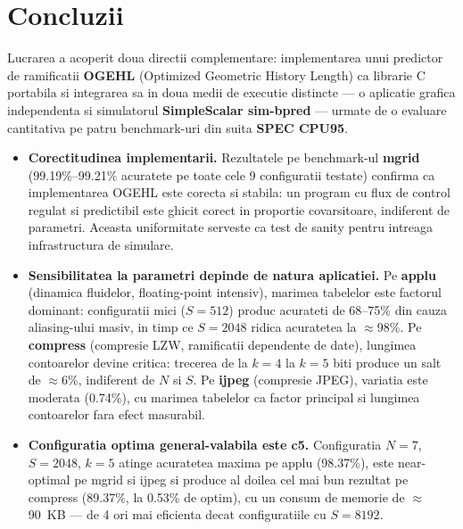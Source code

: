 \section{Concluzii}

Lucrarea a acoperit doua directii complementare: implementarea unui predictor de
ramificatii \textbf{OGEHL} (Optimized Geometric History Length) ca librarie C
portabila si integrarea sa in doua medii de executie distincte --- o aplicatie
grafica independenta si simulatorul \textbf{SimpleScalar sim-bpred} --- urmate de
o evaluare cantitativa pe patru benchmark-uri din suita \textbf{SPEC CPU95}.

\begin{itemize}
    \item \textbf{Corectitudinea implementarii.}
          Rezultatele pe benchmark-ul \textbf{mgrid} (99.19\%--99.21\% acuratete
          pe toate cele 9 configuratii testate) confirma ca implementarea OGEHL
          este corecta si stabila: un program cu flux de control regulat si
          predictibil este ghicit corect in proportie covarsitoare, indiferent
          de parametri. Aceasta uniformitate serveste ca test de sanity pentru
          intreaga infrastructura de simulare.

    \item \textbf{Sensibilitatea la parametri depinde de natura aplicatiei.}
          Pe \textbf{applu} (dinamica fluidelor, floating-point intensiv),
          marimea tabelelor este factorul dominant: configuratii mici
          ($S=512$) produc acurateti de 68--75\% din cauza aliasing-ului masiv,
          in timp ce $S=2048$ ridica acuratetea la $\approx$98\%. Pe
          \textbf{compress} (compresie LZW, ramificatii dependente de date),
          lungimea contoarelor devine critica: trecerea de la $k=4$ la $k=5$
          biti produce un salt de $\approx$6\%, indiferent de $N$ si $S$. Pe
          \textbf{ijpeg} (compresie JPEG), variatia este moderata (0.74\%),
          cu marimea tabelelor ca factor principal si lungimea contoarelor fara
          efect masurabil.

    \item \textbf{Configuratia optima general-valabila este c5.}
          Configuratia $N=7$, $S=2048$, $k=5$ atinge acuratetea maxima pe
          applu (98.37\%), este near-optimal pe mgrid si ijpeg si produce al
          doilea cel mai bun rezultat pe compress (89.37\%, la 0.53\% de
          optim), cu un consum de memorie de $\approx$90~KB --- de 4 ori mai
          eficienta decat configuratiile cu $S=8192$.


\end{itemize}
